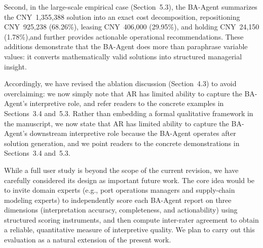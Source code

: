 \documentclass[11pt,a4paper]{article}
\begin{document}
Second, in the large-scale empirical case (Section~5.3), the BA-Agent summarizes the CNY~1,355,388 solution into an exact cost decomposition, repositioning CNY~925,238 (68.26\%), leasing CNY~406,000 (29.95\%), and holding CNY~24,150 (1.78\%),and further provides actionable operational recommendations. These additions demonstrate that the BA-Agent does more than paraphrase variable values: it converts mathematically valid solutions into structured managerial insight.

Accordingly, we have revised the ablation discussion (Section~4.3) to avoid overclaiming: we now simply note that AR has limited ability to capture the BA-Agent's interpretive role, and refer readers to the concrete examples in Sections~3.4 and~5.3. Rather than embedding a formal qualitative framework in the manuscript, we now state that AR has limited ability to capture the BA-Agent's downstream interpretive role because the BA-Agent operates after solution generation, and we point readers to the concrete demonstrations in Sections~3.4 and~5.3. 

While a full user study is beyond the scope of the current revision, we have carefully considered its design as important future work. The core idea would be to invite domain experts (e.g., port operations managers and supply-chain modeling experts) to independently score each BA-Agent report on three dimensions (interpretation accuracy, completeness, and actionability) using structured scoring instruments, and then compute inter-rater agreement to obtain a reliable, quantitative measure of interpretive quality. We plan to carry out this evaluation as a natural extension of the present work.
\end{document}
